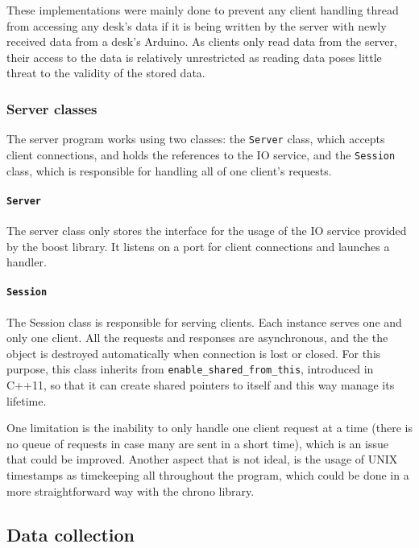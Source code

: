 \documentclass[english,fira]{ist-report}
\begin{document}
These implementations were mainly done to prevent any client handling thread from accessing any desk's data if it is being written by the server with newly received data from a desk's Arduino. As clients only read data from the server, their access to the data is relatively unrestricted as reading data poses little threat to the validity of the stored data.

\subsubsection{Server classes}\label{sec:classes}

The server program works using two classes: the \texttt{Server} class, which accepts client connections, and holds the references to the IO service, and the \texttt{Session} class, which is responsible for handling all of one client's requests.

\paragraph{\texttt{Server}}

The server class only stores the interface for the usage of the IO service provided by the boost library. It listens on a port for client connections and launches a handler. 

\paragraph{\texttt{Session}}

The Session class is responsible for serving clients. Each instance serves one and only one client. All the requests and responses are asynchronous, and the the object is destroyed automatically when connection is lost or closed.
For this purpose, this class inherits from \texttt{enable\_shared\_from\_this}, introduced in C++11, so that it can create shared pointers to itself and this way manage its lifetime.

One limitation is the inability to only handle one client request at a time (there is no queue of requests in case many are sent in a short time), which is an issue that could be improved.
Another aspect that is not ideal, is the usage of UNIX timestamps as timekeeping all throughout the program, which could be done in a more straightforward way with the chrono library.

\subsection{Data collection}
\end{document}
